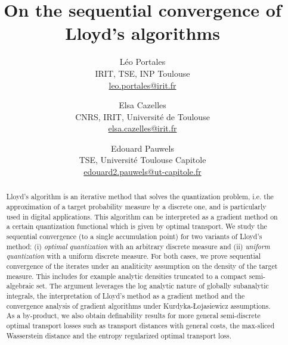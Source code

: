 \documentclass[11pt]{article}
\title{On the sequential convergence of Lloyd's algorithms}
\author{
  Léo Portales\\
  IRIT, TSE, INP Toulouse\\
  \url{leo.portales@irit.fr}
  \and
  Elsa Cazelles\\
  CNRS, IRIT, Université de Toulouse\\
  \url{elsa.cazelles@irit.fr}
  \and
  Edouard Pauwels\\
  TSE, Université Toulouse Capitole\\
  \url{edouard2.pauwels@ut-capitole.fr}
}
\newcommand{\1}{\mathbbm{1}}
\numberwithin{equation}{section}
\begin{document}
\maketitle


\begin{abstract}

	Lloyd's algorithm is an iterative method that solves the quantization problem, i.e. the approximation of a target probability measure by a discrete one, and is particularly used in digital applications.
    This algorithm can be interpreted as a gradient method on a certain quantization functional which is given by optimal transport.
	We study the sequential convergence (to a single accumulation point) for two variants of Lloyd's method: (i) \emph{optimal quantization} with an arbitrary discrete measure and (ii) \emph{uniform quantization} with a uniform discrete measure. For both cases, we prove sequential convergence of the iterates under an analiticity assumption on the density of the target measure. This includes for example analytic densities truncated to a compact semi-algebraic set. The argument leverages the log analytic nature of globally subanalytic integrals, the interpretation of Lloyd's method as a gradient method and the convergence analysis of gradient algorithms under Kurdyka-\L{ojasiewicz} assumptions. 
	As a by-product, we also obtain definability results for more general semi-discrete optimal transport losses such as transport distances with general costs, the max-sliced Wasserstein distance and the entropy regularized optimal transport loss.
\end{abstract}
\end{document}
